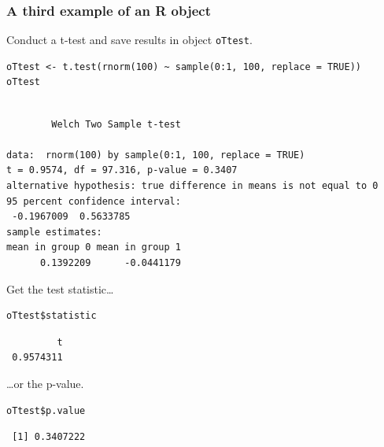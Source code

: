 \documentclass[bigger]{beamer}
\begin{document}
\begin{frame}[fragile,shrink = 20]
\frametitle{A third example of an R object}
\label{sec-1-1-10}

    Conduct a t-test and save results in object \texttt{oTtest}.


\lstset{language=R}
\begin{lstlisting}
oTtest <- t.test(rnorm(100) ~ sample(0:1, 100, replace = TRUE))
oTtest
\end{lstlisting}



\begin{verbatim}

        Welch Two Sample t-test

data:  rnorm(100) by sample(0:1, 100, replace = TRUE) 
t = 0.9574, df = 97.316, p-value = 0.3407
alternative hypothesis: true difference in means is not equal to 0 
95 percent confidence interval:
 -0.1967009  0.5633785 
sample estimates:
mean in group 0 mean in group 1 
      0.1392209      -0.0441179
\end{verbatim}


Get the test statistic\ldots


\lstset{language=R}
\begin{lstlisting}
oTtest$statistic
\end{lstlisting}

\begin{verbatim}
         t 
 0.9574311
\end{verbatim}

\ldots or the p-value.


\lstset{language=R}
\begin{lstlisting}
oTtest$p.value
\end{lstlisting}

\begin{verbatim}
 [1] 0.3407222
\end{verbatim}
\end{frame}
\end{document}
